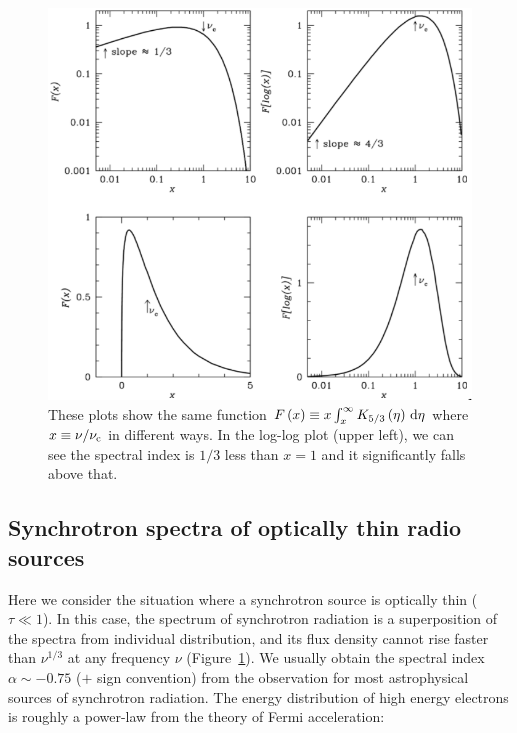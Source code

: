 \begin{figure}[htbp]
	\centering
	\includegraphics[width=\linewidth]{Chapter_2/Figures/NRAO_radio5n6.png}
    \caption[The synchrotron spectrum of a single electron]{\label{fig:nrao_radio5n6}
        These plots show the same function $F\left(x\right) \equiv x\int^{\infty}_x K_{5/3}\left(\eta\right)\,\mathrm{d}\eta$ where $x \equiv \nu / \nu_{\mathrm{c}}$ in different ways.
        In the log-log plot (upper left), we can see the spectral index is $1/3$ less than $x=1$ and it significantly falls above that.
    }
\end{figure}



\subsection{Synchrotron spectra of optically thin radio sources}\label{subsec:synchrotronspectra_opticallythin}
Here we consider the situation where a synchrotron source is optically thin ($\tau \ll 1$).
In this case, the spectrum of synchrotron radiation is a superposition of the spectra from individual distribution, and its flux density cannot rise faster than $\nu^{1/3}$ at any frequency $\nu$ (Figure~\ref{fig:nrao_radio5n6}).
We usually obtain the spectral index $\alpha\sim-0.75$ ($+$ sign convention) from the observation for most astrophysical sources of synchrotron radiation.
The energy distribution of high energy electrons is roughly a power-law from the theory of Fermi acceleration:

